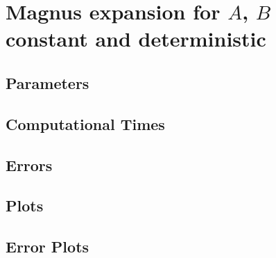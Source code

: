 \section{Magnus expansion for $A$, $B$ constant and deterministic}
	
\subsection{Parameters}
	
\subsection{Computational Times}
	
\subsection{Errors}
	
\subsection{Plots}
	
\subsection{Error Plots}
	
